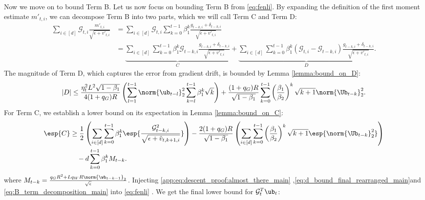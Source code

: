\documentclass[11pt, letterpaper]{article}
\begin{document}
Now we move on to bound Term B. Let us now focus on bounding Term B from \eqref{eq:fenli}. By expanding the definition of the first moment estimate $m'_{t, i}$, we can decompose Term B into two parts, which we will call Term C and Term D:
\begin{align}
\sum_{i \in [d]}\mathcal{G}_{t, i}\frac{m'_{t, i}}{\sqrt{\epsilon+v'_{t, i}}} &=
\sum_{i \in [d]} \mathcal{G}_{t, i} \sum_{k=0}^{t-1} \beta_1^k \frac{g_{t-k, i}+\delta_{t-k,i}}{\sqrt{\epsilon+v'_{t, i}}}
\\
&=
\underbrace{\sum_{i \in [d]} \sum_{k=0}^{t-1}\beta_1^k \mathcal{G}_{t-k, i} \frac{g_{t - k, i}+\delta_{t-k,i}}{\sqrt{\epsilon+{v'_{t, i}}}}}_C
+ \underbrace{\sum_{i \in [d]} \sum_{k=0}^{t-1} \beta_1^k \left(\mathcal{G}_{t, i} - \mathcal{G}_{t -k, i}\right) \frac{g_{t - k, i}+\delta_{t-k,i}}{\sqrt{\epsilon+v'_{t, i}}}}_D.
\label{eq:B_term_decomposition_main}
\end{align}
The magnitude of Term D, which captures the error from gradient drift, is bounded by Lemma \ref{lemma:bound_on_D}:
\begin{align}
|D| \leq \frac{\eta_t^2 L^2 \sqrt{1 - \beta_1}}{4 (1+q_G)R}\left( \sum_{l=1}^{t-1}\norm{\ub_{t-l}}_2^2\sum_{k=l}^{t - 1}\beta_1^k \sqrt{k} \right)
+\frac{(1+q_G)R}{\sqrt{1 - \beta_1}} \sum_{k=0}^{t-1} \left(\frac{\beta_1}{\beta_2}\right)^k \sqrt{k+1}\norm{\Ub_{t-k}}_2^2.
\label{eq:d_bound_final_rearranged_main}
\end{align}
For Term C, we establish a lower bound on its expectation in Lemma \ref{lemma:bound_on_C}:
\begin{align}
\nonumber
    \esp{C} &\geq \frac{1}{2}\left(\sum_{i\in [d]} \sum_{k=0}^{t-1}\beta_1^k\esp{\frac{\mathcal{G}_{t - k, i}^2}{\sqrt{\epsilon+\tilde{v}_{t, k+1, i}}}}\right) -
    \frac{2 (1+q_G)R}{\sqrt{1 - \beta_1}}\left(\sum_{i\in [d]} \sum_{k=0}^{t-1}
     \left(\frac{\beta_1}{\beta_2}\right)^k \sqrt{k+1} \esp{\norm{\Ub_{t -k}}_2^2}\right)\\
     &\quad-d\sum_{k=0}^{t-1}\beta_1^kM_{t-k}
    \label{app:eq:descent_proof:almost_there_main}.
\end{align}
where $M_{t-k} = \frac{q_GR^2+Lq_WR\norm{\wb_{t-k-1}}_2}{\sqrt{\epsilon}}$. Injecting \eqref{app:eq:descent_proof:almost_there_main} ,\eqref{eq:d_bound_final_rearranged_main}and \eqref{eq:B_term_decomposition_main} into \eqref{eq:fenli} . We get the final lower bound for $\mathcal{G}_t^T \ub_t$:
\end{document}
